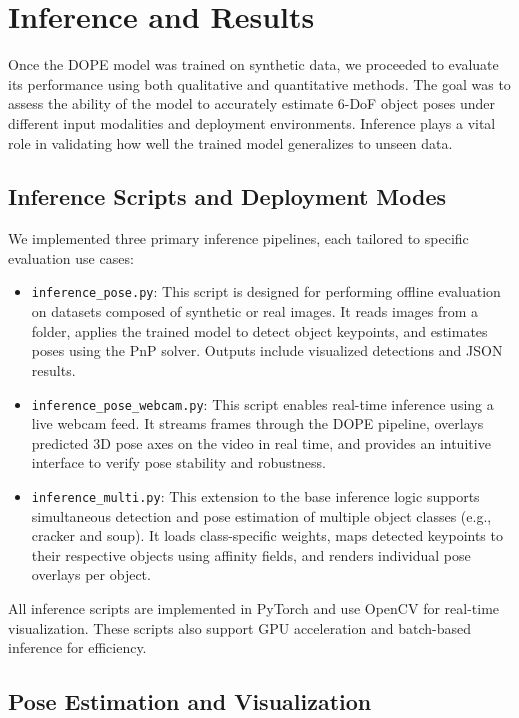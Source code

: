 \documentclass[conference]{IEEEtran}
\begin{document}
\section{Inference and Results}
Once the DOPE model was trained on synthetic data, we proceeded to evaluate its performance using both qualitative and quantitative methods. The goal was to assess the ability of the model to accurately estimate 6-DoF object poses under different input modalities and deployment environments. Inference plays a vital role in validating how well the trained model generalizes to unseen data.

\subsection{Inference Scripts and Deployment Modes}
We implemented three primary inference pipelines, each tailored to specific evaluation use cases:

\begin{itemize}
\item \texttt{inference\_pose.py}: This script is designed for performing offline evaluation on datasets composed of synthetic or real images. It reads images from a folder, applies the trained model to detect object keypoints, and estimates poses using the PnP solver. Outputs include visualized detections and JSON results.

\item \texttt{inference\_pose\_webcam.py}: This script enables real-time inference using a live webcam feed. It streams frames through the DOPE pipeline, overlays predicted 3D pose axes on the video in real time, and provides an intuitive interface to verify pose stability and robustness.

\item \texttt{inference\_multi.py}: This extension to the base inference logic supports simultaneous detection and pose estimation of multiple object classes (e.g., cracker and soup). It loads class-specific weights, maps detected keypoints to their respective objects using affinity fields, and renders individual pose overlays per object.
\end{itemize}


All inference scripts are implemented in PyTorch and use OpenCV for real-time visualization. These scripts also support GPU acceleration and batch-based inference for efficiency.

\subsection{Pose Estimation and Visualization}
\end{document}
